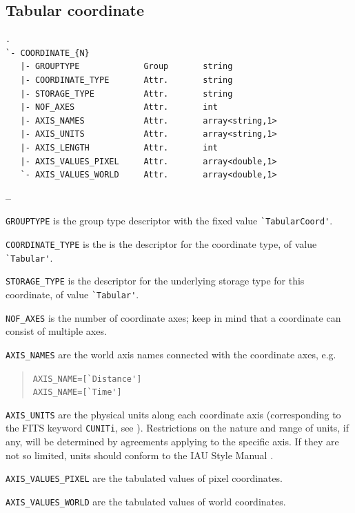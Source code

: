 \documentclass[a4paper,10pt,bibtotoc]{scrreprt}
\begin{document}
\subsection{Tabular coordinate}
\label{sec:coord-tabular}



\begin{lstlisting}[float,caption={Structure of the tabular coordinate group.}]
.
`- COORDINATE_{N}
   |- GROUPTYPE             Group       string
   |- COORDINATE_TYPE       Attr.       string
   |- STORAGE_TYPE          Attr.       string
   |- NOF_AXES              Attr.       int
   |- AXIS_NAMES            Attr.       array<string,1>
   |- AXIS_UNITS            Attr.       array<string,1>
   |- AXIS_LENGTH           Attr.       int
   |- AXIS_VALUES_PIXEL     Attr.       array<double,1>
   `- AXIS_VALUES_WORLD     Attr.       array<double,1>
\end{lstlisting}

\begin{list}{\textbf{--}}{}
\item \verb|GROUPTYPE| is the group type descriptor with the fixed value 
  \verb|`TabularCoord'|. 
\item \verb|COORDINATE_TYPE| is the is the descriptor for the
  coordinate type, of value \verb|`Tabular'|.
\item \verb|STORAGE_TYPE| is the descriptor for the underlying storage
  type for this coordinate, of value \verb|`Tabular'|.
\item \verb|NOF_AXES| is the number of coordinate axes; keep in mind that a
  coordinate can consist of multiple axes.
\item \verb|AXIS_NAMES| are the world axis names connected with the
  coordinate axes, e.g.
  \begin{verse}
    \verb|AXIS_NAME=[`Distance']| \\
    \verb|AXIS_NAME=[`Time']|
  \end{verse}
\item \verb|AXIS_UNITS| are the physical units along each coordinate axis
  (corresponding to the FITS keyword \verb|CUNITi|, see \cite{fits.paper1}).
  Restrictions on the nature and range of units, if any, will be determined by
  agreements applying to the specific axis. If they are not so limited, units
  should conform to the IAU Style Manual \cite{mcnally.1988}.
\item \verb|AXIS_VALUES_PIXEL| are the tabulated values of pixel coordinates.
\item \verb|AXIS_VALUES_WORLD| are the tabulated values of world coordinates.
\end{list}
\end{document}
